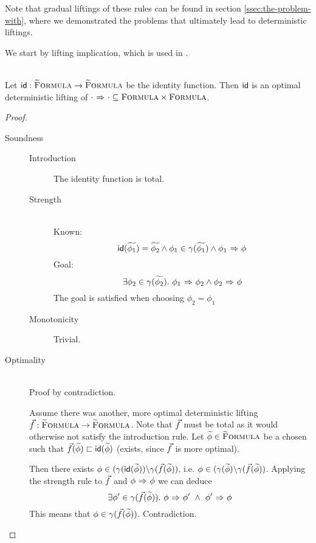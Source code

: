 Note that gradual liftings of these rules can be found in section \ref{ssec:the-problem-with}, where we demonstrated the problems that ultimately lead to deterministic liftings.

We start by lifting implication, which is used in .
\begin{lemma}~\\
    \label{lemma:opt-lift-impl}
    Let $\textup{\textmd{\textsf{id}}} : \textup{\textsc{\ensuremath{\widetilde{\text{F}}}ormula}} \rightarrow \textup{\textsc{\ensuremath{\widetilde{\text{F}}}ormula}}$ be the identity function.
    Then $\textup{\textmd{\textsf{id}}}$ is an optimal deterministic lifting of ${\cdot} \,\,{\Rightarrow}\,\, {\cdot} \subseteq \textup{\textsc{Formula}} \times \textup{\textsc{Formula}}$.
\end{lemma}
\begin{proof}~
    \begin{description}
        \item[Soundness]
        \begin{description}
            \item[Introduction] The identity function is total.
            
            \item[Strength]~\\
            Known:
            $$\textup{\textmd{\textsf{id}}}(\widetilde{\phi_1}) = \widetilde{\phi_2} \wedge \phi_1 \in \gamma(\widetilde{\phi_1}) \wedge {\phi_1} \,\,{\Rightarrow}\,\, {\phi}$$
            Goal:
            $$\exists \phi_2 \in \gamma(\widetilde{\phi_2}).~ {\phi_1} \,\,{\Rightarrow}\,\, {\phi_2} \wedge {\phi_2} \,\,{\Rightarrow}\,\, {\phi}$$
            The goal is satisfied when choosing $\phi_2 = \phi_1$
            
            \item[Monotonicity] Trivial.
        \end{description}
        \item[Optimality]~\\
        Proof by contradiction.
        
        Assume there was another, more optimal deterministic lifting $\vec{f} : \textup{\textsc{\ensuremath{\widetilde{\text{F}}}ormula}} \rightarrow \textup{\textsc{\ensuremath{\widetilde{\text{F}}}ormula}}$.
        Note that $\vec{f}$ must be total as it would otherwise not satisfy the introduction rule.
        Let $\widetilde{\phi} \in \textup{\textsc{\ensuremath{\widetilde{\text{F}}}ormula}}$ be a chosen such that $\vec{f}(\widetilde{\phi}) \sqsubset \textup{\textmd{\textsf{id}}}(\widetilde{\phi})$ (exists, since $\vec{f}$ is more optimal).
        
        Then there exists $\phi \in (\gamma(\textup{\textmd{\textsf{id}}}(\widetilde{\phi})) \backslash \gamma(\vec{f}(\widetilde{\phi}))$, i.e. $\phi \in (\gamma(\widetilde{\phi}) \backslash \gamma(\vec{f}(\widetilde{\phi}))$.
        Applying the strength rule to $\vec{f}$ and ${\phi} \,\,{\Rightarrow}\,\, {\phi}$ we can deduce
        $$\exists \phi' \in \gamma(\vec{f}(\widetilde{\phi})).~ {\phi} \,\,{\Rightarrow}\,\, {\phi'} ~\wedge~ {\phi'} \,\,{\Rightarrow}\,\, {\phi}$$
        This means that $\phi \in \gamma(\vec{f}(\widetilde{\phi}))$.
        Contradiction.
    \end{description}
\end{proof}

